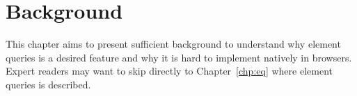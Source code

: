 \documentclass[a4paper,11pt]{kth-mag}
\begin{document}



  \chapter{Background}\label{chp:background}
    This chapter aims to present sufficient background to understand why element queries is a desired feature and why it is hard to implement natively in browsers.
    Expert readers may want to skip directly to Chapter~\ref{chp:eq} where element queries is described.
\end{document}

